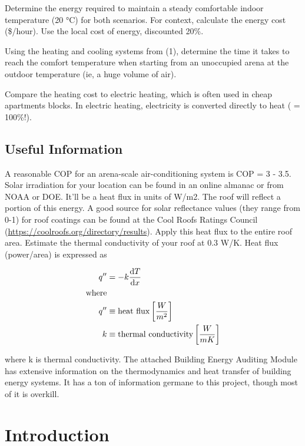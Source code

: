 \documentclass[
]{book}
\begin{document}
Determine the energy required to maintain a steady comfortable indoor temperature (20 °C) for both scenarios. For context, calculate the energy cost (\$/hour). Use the local cost of energy, discounted 20\%.

Using the heating and cooling systems from (1), determine the time it takes to reach the comfort temperature when starting from an unoccupied arena at the outdoor temperature (ie, a huge volume of air).

Compare the heating cost to electric heating, which is often used in cheap apartments blocks. In electric heating, electricity is converted directly to heat ( = 100\%!).

\hypertarget{useful-information}{%
\section{Useful Information}\label{useful-information}}

A reasonable COP for an arena-scale air-conditioning system is COP = 3 - 3.5.
Solar irradiation for your location can be found in an online almanac or from NOAA or DOE. It'll be a heat flux in units of W/m2. The roof will reflect a portion of this energy. A good source for solar reflectance values (they range from 0-1) for roof coatings can be found at the Cool Roofs Ratings Council (\url{https://coolroofs.org/directory/results}). Apply this heat flux to the entire roof area.
Estimate the thermal conductivity of your roof at 0.3 W/K. Heat flux (power/area) is expressed as

\begin{align}
 q'' &= -k \frac{\text dT}{\text dx} \\
 \text{where}\hfill \notag \\
 q'' &\equiv \text{heat flux} \left[ \frac{W}{m^2} \right]  \notag \\
 k &\equiv \text{thermal conductivity} \left[ \frac{W}{m K} \right]  \notag 
\end{align}

where k is thermal conductivity.
The attached Building Energy Auditing Module has extensive information on the thermodynamics and heat transfer of building energy systems. It has a ton of information germane to this project, though most of it is overkill.

\hypertarget{intro}{%
\chapter{Introduction}\label{intro}}
\end{document}
